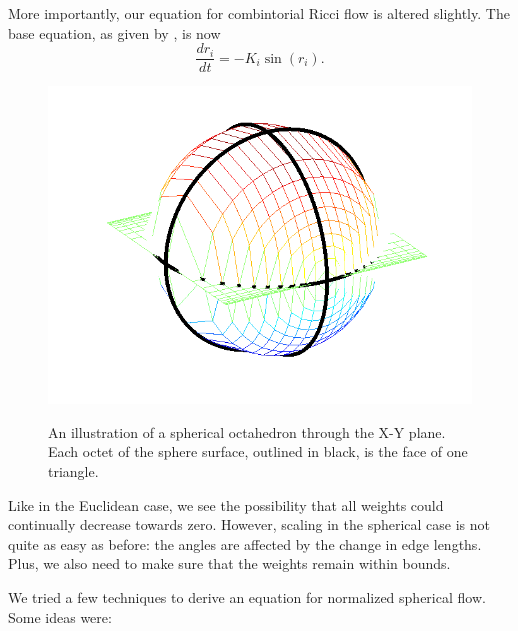 \documentclass[12pt]{article}
\begin{document}
\noindent More importantly, our equation for combintorial Ricci flow is altered slightly. The base equation, as given by \cite{chowluo}, is now 
\begin{equation}
\label{SRiccif}
\frac{dr_i}{dt} = -K_i\sin(r_i).
\end{equation}

\begin{figure}
\centering
\includegraphics[scale = 0.6]{Pictures/octosph.png}
\label{OctoSph}
\caption{An illustration of a spherical octahedron through the X-Y plane. Each octet of the sphere surface, outlined in black, is the face of one triangle.} 
\end{figure}

\noindent Like in the Euclidean case, we see the possibility that all weights could continually decrease towards zero. However, scaling in the spherical case is not quite as easy as before: the angles are affected by the change in edge lengths. Plus, we also need to make sure that the weights remain within bounds.\newline

\noindent We tried a few techniques to derive an equation for normalized spherical flow. Some ideas were:
\end{document}
